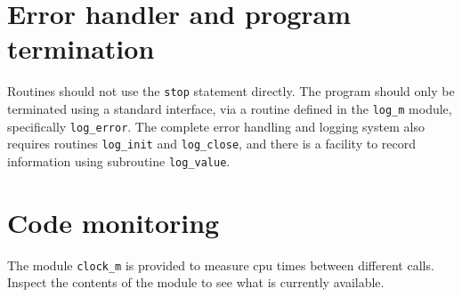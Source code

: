 \documentclass[11pt,twoside,a4paper]{report}
\begin{document}
\section{Error handler and program termination}

Routines should not use the \verb|stop| statement directly.
The program should only be terminated using a standard interface,
via a routine defined in the \verb|log_m| module,
specifically \verb|log_error|. 
The complete error handling and logging system also requires
routines \verb|log_init| and \verb|log_close|, and there is
a facility to record information using subroutine \verb|log_value|.

%
%
%
%
%
%
%
%

\section{Code monitoring}
The module \verb|clock_m| is provided to measure cpu times between different
calls. Inspect the contents of the module to see what is currently available.
\end{document}
